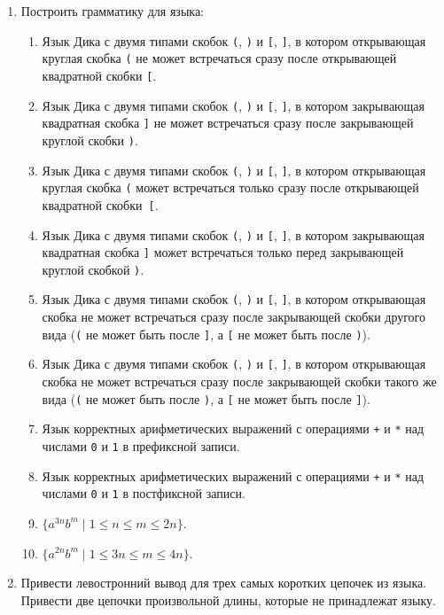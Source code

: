 \documentclass[12pt]{article}
\begin{document}
\begin{enumerate}
\setlength\itemsep{1em}

  \item Построить грамматику для языка:
  \begin{enumerate}[label=\arabic*)]
    \setlength\itemsep{0.8em}
    \item Язык Дика с двумя типами скобок \verb!(!, \verb!)! и \verb![!, \verb!]!, в котором открывающая круглая скобка \verb!(! не может встречаться сразу после открывающей квадратной скобки \verb![!.
    \item Язык Дика с двумя типами скобок \verb!(!, \verb!)! и \verb![!, \verb!]!, в котором закрывающая квадратная скобка \verb!]! не может встречаться сразу после закрывающей круглой скобки \verb!)!.
    \item Язык Дика с двумя типами скобок \verb!(!, \verb!)! и \verb![!, \verb!]!, в котором открывающая круглая скобка \verb!(! может встречаться только сразу после открывающей квадратной скобки~\verb![!.
    \item Язык Дика с двумя типами скобок \verb!(!, \verb!)! и \verb![!, \verb!]!, в котором закрывающая квадратная скобка \verb!]! может встречаться только перед закрывающей круглой скобкой \verb!)!.
    \item Язык Дика с двумя типами скобок \verb!(!, \verb!)! и \verb![!, \verb!]!, в котором открывающая скобка не может встречаться сразу после закрывающей скобки другого вида (\verb!(! не может быть после \verb!]!, а \verb![! не может быть после \verb!)!).
    \item Язык Дика с двумя типами скобок \verb!(!, \verb!)! и \verb![!, \verb!]!, в котором открывающая скобка не может встречаться сразу после закрывающей скобки такого же вида (\verb!(! не может быть после \verb!)!, а \verb![! не может быть после \verb!]!).
    \item Язык корректных арифметических выражений с операциями \verb!+! и \verb!*! над числами \verb!0! и \verb!1! в префиксной записи.
    \item Язык корректных арифметических выражений с операциями \verb!+! и \verb!*! над числами \verb!0! и \verb!1! в постфиксной записи.
    \item $\{a^{3n} b^m \mid 1 \leq n \leq m \leq 2n \}$.
    \item $\{a^{2n} b^m \mid 1 \leq 3n \leq m \leq 4n \}$.
  \end{enumerate}

  \item Привести левостронний вывод для трех самых коротких цепочек из языка. Привести две цепочки произвольной длины, которые не принадлежат языку.


\end{enumerate}
\end{document}
